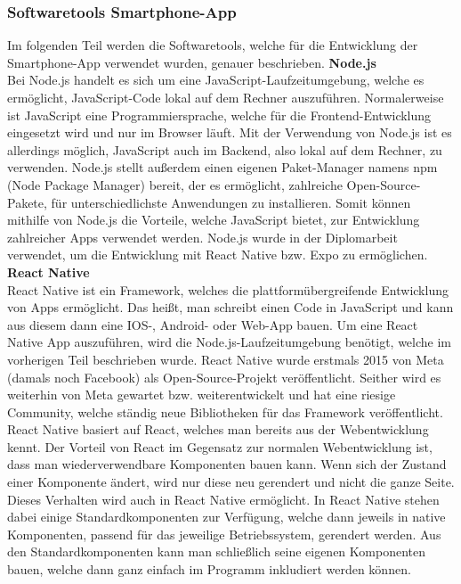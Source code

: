 \documentclass[11pt, twoside]{article}
\begin{document}
\subsubsection{Softwaretools Smartphone-App}
Im folgenden Teil werden die Softwaretools, welche für die Entwicklung der Smartphone-App verwendet wurden, genauer beschrieben.
\vspace{4mm}\newline
\textbf{Node.js} \\
Bei Node.js handelt es sich um eine JavaScript-Laufzeitumgebung, welche es ermöglicht, JavaScript-Code lokal auf dem Rechner auszuführen. Normalerweise ist JavaScript eine Programmiersprache, welche für die Frontend-Entwicklung eingesetzt wird und nur im Browser läuft. Mit der Verwendung von Node.js ist es allerdings möglich, JavaScript auch im Backend, also lokal auf dem Rechner, zu verwenden. Node.js stellt außerdem einen eigenen Paket-Manager namens \glqq npm \grqq{} (Node Package Manager) bereit, der es ermöglicht, zahlreiche Open-Source-Pakete, für unterschiedlichste Anwendungen zu installieren. Somit können mithilfe von Node.js die Vorteile, welche JavaScript bietet, zur Entwicklung zahlreicher Apps verwendet werden. \parencite[vgl.][]{noauthor_urlpi25_2021}
Node.js wurde in der Diplomarbeit verwendet, um die Entwicklung mit React Native bzw. Expo zu ermöglichen.
\vspace{4mm}\newline
\textbf{React Native} \\
React Native ist ein Framework, welches die plattformübergreifende Entwicklung von Apps ermöglicht. Das heißt, man schreibt einen Code in JavaScript und kann aus diesem dann eine IOS-, Android- oder Web-App bauen. Um eine React Native App auszuführen, wird die Node.js-Laufzeitumgebung benötigt, welche im vorherigen Teil beschrieben wurde. React Native wurde erstmals 2015 von Meta (damals noch Facebook) als Open-Source-Projekt veröffentlicht. Seither wird es weiterhin von Meta gewartet bzw. weiterentwickelt und hat eine riesige Community, welche ständig neue Bibliotheken für das Framework veröffentlicht. React Native basiert auf React, welches man bereits aus der Webentwicklung kennt. Der Vorteil von React im Gegensatz zur normalen Webentwicklung ist, dass man wiederverwendbare Komponenten bauen kann. Wenn sich der Zustand einer Komponente ändert, wird nur diese neu gerendert und nicht die ganze Seite. Dieses Verhalten wird auch in React Native ermöglicht. In React Native stehen dabei einige Standardkomponenten zur Verfügung, welche dann jeweils in native Komponenten, passend für das jeweilige Betriebssystem, gerendert werden. Aus den Standardkomponenten kann man schließlich seine eigenen Komponenten bauen, welche dann ganz einfach im Programm inkludiert werden können.
\end{document}

